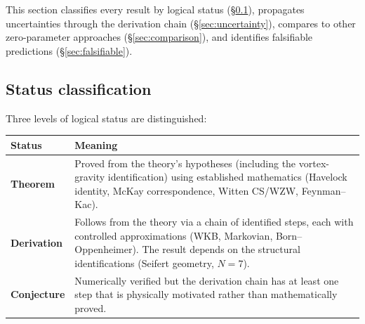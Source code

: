 This section classifies every result by logical status
(\S\ref{sec:status}), propagates uncertainties through
the derivation chain (\S\ref{sec:uncertainty}), compares
to other zero-parameter approaches (\S\ref{sec:comparison}),
and identifies falsifiable predictions (\S\ref{sec:falsifiable}).

\subsection{Status classification}
\label{sec:status}
Three levels of logical status are distinguished:
\begin{center}
\small
\begin{tabular}{lp{8cm}}
\toprule
Status & Meaning \\
\midrule
\textbf{Theorem} & Proved from the theory's hypotheses
  (including the vortex-gravity identification) using
  established mathematics (Havelock identity, McKay
  correspondence, Witten CS/WZW, Feynman--Kac). \\
\textbf{Derivation} & Follows from the theory via a
  chain of identified steps, each with controlled
  approximations (WKB, Markovian, Born--Oppenheimer).
  The result depends on the structural identifications
  (Seifert geometry, $N = 7$). \\
\textbf{Conjecture} & Numerically verified but
  the derivation chain has at least one step that is
  physically motivated rather than mathematically proved. \\
\bottomrule
\end{tabular}
\end{center}

